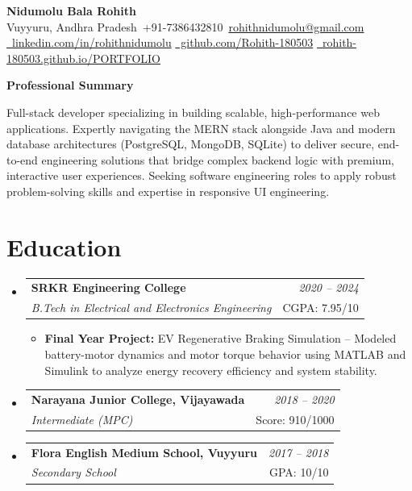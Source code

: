\documentclass[a4paper,11pt]{article}
\makeatletter
\newcommand{\resumeSubheading}[4]{
\vspace{0.5mm}\item
    \begin{tabular*}{0.98\textwidth}[t]{l@{\extracolsep{\fill}}r}
        \textbf{#1} & \textit{\footnotesize{#4}} \\
        \textit{\footnotesize{#3}} &  \footnotesize{#2}\\
    \end{tabular*}
    \vspace{-2.4mm}
}
\newcommand{\resumeSubHeadingListStart}{\begin{itemize}[leftmargin=*,labelsep=0mm]}
\newcommand{\resumeItemListStart}{\begin{justify}\begin{itemize}[leftmargin=3ex, rightmargin=2ex, noitemsep,labelsep=1.2mm,itemsep=0mm]\small}
\newcommand{\resumeSubHeadingListEnd}{\end{itemize}\vspace{1mm}}
\newcommand{\resumeItemListEnd}{\end{itemize}\end{justify}\vspace{-2mm}}
\newcommand{\cvsection}[1]{%
\vspace{2mm}
\begin{tcolorbox}
    \textbf{\large #1}
\end{tcolorbox}
    \vspace{-4mm}
}
\newcommand{\name}{Nidumolu Bala Rohith}
\newcommand{\phone}{7386432810}
\newcommand{\emaila}{rohithnidumolu@gmail.com}
\newcommand{\location}{Vuyyuru, Andhra Pradesh}
\newcommand{\linkedin}{linkedin.com/in/rohithnidumolu}
\newcommand{\github}{github.com/Rohith-180503}
\newcommand{\portfolio}{rohith-180503.github.io/PORTFOLIO}
\makeatother
\begin{document}
\selectfont

\begin{center}
{\Huge \textbf{\name}} \\[3pt]
\small
\location \textbar\ +91-\phone \textbar\ \href{mailto:\emaila}{\emaila} \\
\href{https://\linkedin}{\faLinkedin\ \linkedin} \hspace{2mm}
\href{https://\github}{\faGithub\ \github} \hspace{2mm}
\href{https://\portfolio}{\faGlobe\ \portfolio}
\end{center}

\cvsection{Professional Summary}
\begin{justify}\small
Full-stack developer specializing in building scalable, high-performance web applications. Expertly navigating the MERN stack alongside Java and modern database architectures (PostgreSQL, MongoDB, SQLite) to deliver secure, end-to-end engineering solutions that bridge complex backend logic with premium, interactive user experiences. Seeking software engineering roles to apply robust problem-solving skills and expertise in responsive UI engineering.
\end{justify}
\vspace{-2mm}

\section{\textbf{Education}}
\resumeSubHeadingListStart
  \resumeSubheading
    {SRKR Engineering College}{CGPA: 7.95/10}
    {B.Tech in Electrical and Electronics Engineering}{2020 -- 2024}
    \resumeItemListStart
      \item \textbf{Final Year Project:} EV Regenerative Braking Simulation -- Modeled battery-motor dynamics and motor torque behavior using MATLAB and Simulink to analyze energy recovery efficiency and system stability.
    \resumeItemListEnd
  \resumeSubheading
    {Narayana Junior College, Vijayawada}{Score: 910/1000}
    {Intermediate (MPC)}{2018 -- 2020}
  \resumeSubheading
    {Flora English Medium School, Vuyyuru}{GPA: 10/10}
    {Secondary School}{2017 -- 2018}
\resumeSubHeadingListEnd
\vspace{-4.5mm}
\end{document}

